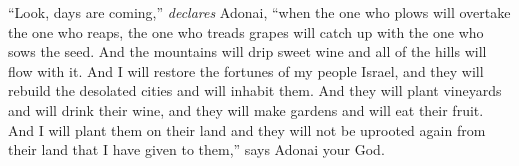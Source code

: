 \begin{biblechapter}
\verse “Look, days are coming,” \textit{declares} Adonai, “when the one who plows will overtake the one who reaps, the one who treads grapes will catch up with the one who sows the seed. And the mountains will drip sweet wine and all of the hills will flow with it.
\verse And I will restore the fortunes of my people Israel, and they will rebuild the desolated cities and will inhabit them. And they will plant vineyards and will drink their wine, and they will make gardens and will eat their fruit.
\verse And I will plant them on their land and they will not be uprooted again from their land that I have given to them,” says Adonai your God.
\end{biblechapter}

